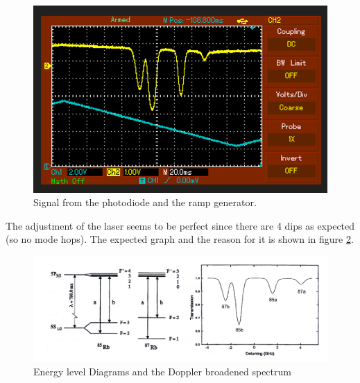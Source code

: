 \begin{figure}
    \centering
    \includegraphics[width=\textwidth]{BMP.png}
    \caption{Signal from the photodiode and the ramp generator.}
    \label{fig:abs}
\end{figure}

\noindent
The adjustment of the laser seems to be perfect since there are 4 dips as expected (so no mode hops). The 
expected graph and the reason for it is shown in figure \ref{fig:lit}.

\begin{figure}
    \centering
    \includegraphics[width=\textwidth]{lit.png}
    \caption{Energy level Diagrams and the Doppler broadened spectrum \cite{V60}}
    \label{fig:lit}
\end{figure}

